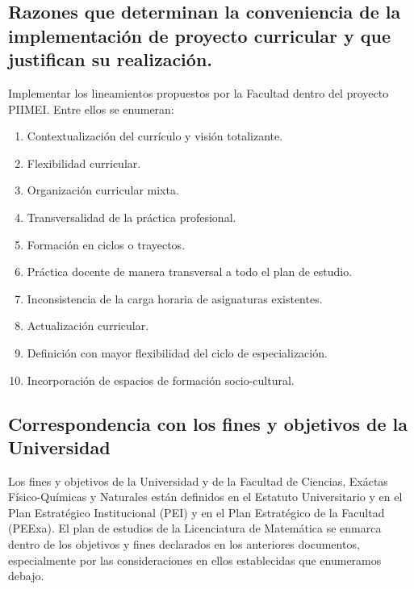 \documentclass[a4paper, 12pt]{article}
\begin{document}
\subsection{Razones que determinan la conveniencia de la implementación de proyecto curricular  y que justifican su realización.}

Implementar los lineamientos propuestos por la Facultad dentro del proyecto PIIMEI. Entre ellos se enumeran:

\begin{enumerate}
\item Contextualización del currículo y visión totalizante.
\item Flexibilidad curricular.
\item Organización curricular mixta.
\item Transversalidad de la práctica profesional.
\item Formación en ciclos o trayectos.
\item Práctica docente de manera transversal a todo el plan de estudio.
\item Inconsistencia de la carga horaria de asignaturas existentes.
\item Actualización curricular.
\item Definición con mayor flexibilidad del ciclo de especialización.
\item Incorporación de espacios de formación socio-cultural.

\end{enumerate}

\subsection{Correspondencia con los fines y objetivos de la
Universidad} 

Los fines y objetivos de la Universidad y de la Facultad de Ciencias, Exáctas Físico-Químicas y Naturales están definidos en el Estatuto Universitario y en el Plan Estratégico Institucional (PEI) y en el Plan Estratégico  de la Facultad (PEExa). El plan de estudios de la Licenciatura de Matemática se enmarca dentro de los objetivos y fines declarados en los anteriores documentos, especialmente por las consideraciones en ellos establecidas  que enumeramos debajo. 
\end{document}
